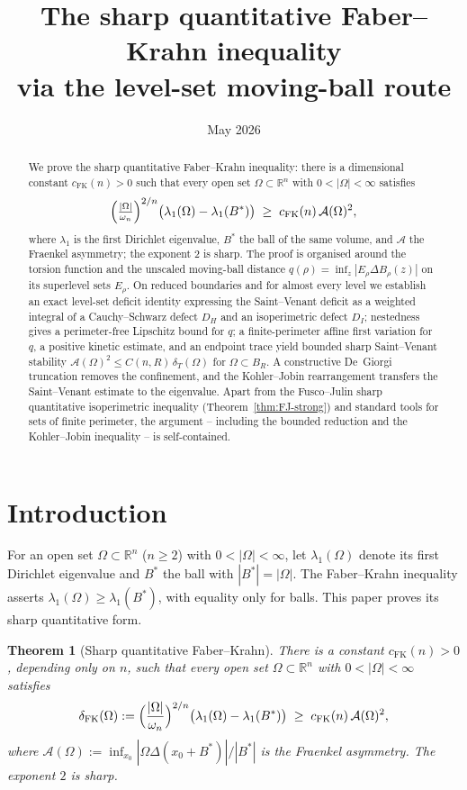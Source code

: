 \documentclass[11pt]{amsart}
\title[Sharp quantitative Faber--Krahn stability]
{The sharp quantitative Faber--Krahn inequality\\
via the level-set moving-ball route}
\author{}
\date{May 2026}
\newtheorem{theorem}{Theorem}[section]
\theoremstyle{definition}
\newcommand{\R}{\mathbb R}
\newcommand{\Om}{\Omega}
\newcommand{\Fr}{\mathcal A}
\newcommand{\dT}{\delta_T}
\newcommand{\Bstar}{B^*}
\newcommand{\deltaFK}{\delta_{\mathrm{FK}}}
\begin{document}
\begin{abstract}
We prove the sharp quantitative Faber--Krahn inequality: there is a dimensional
constant \(c_{\mathrm{FK}}(n)>0\) such that every open set \(\Om\subset\R^n\)
with \(0<|\Om|<\infty\) satisfies
\[
   \Bigl(\tfrac{|\Om|}{\omega_n}\Bigr)^{2/n}
   \bigl(\lambda_1(\Om)-\lambda_1(\Bstar)\bigr)
   \;\ge\; c_{\mathrm{FK}}(n)\,\Fr(\Om)^2 ,
\]
where \(\lambda_1\) is the first Dirichlet eigenvalue, \(\Bstar\) the ball of
the same volume, and \(\Fr\) the Fraenkel asymmetry; the exponent \(2\) is
sharp.  The proof is organised around the torsion function and the unscaled
moving-ball distance \(q(\rho)=\inf_{z}|E_\rho\Delta B_\rho(z)|\) on its
superlevel sets \(E_\rho\).  On reduced boundaries and for almost every level we
establish an exact level-set deficit identity expressing the Saint--Venant
deficit as a weighted integral of a Cauchy--Schwarz defect \(D_H\) and an
isoperimetric defect \(D_I\); nestedness gives a perimeter-free Lipschitz bound
for \(q\); a finite-perimeter affine first variation for \(q\), a positive
kinetic estimate, and an endpoint trace yield bounded sharp Saint--Venant
stability \(\Fr(\Om)^2\le C(n,R)\,\dT(\Om)\) for \(\Om\subset B_R\).  A
constructive De~Giorgi truncation removes the confinement, and the
Kohler--Jobin rearrangement transfers the Saint--Venant estimate to the
eigenvalue.  Apart from the Fusco--Julin sharp quantitative isoperimetric
inequality (Theorem~\ref{thm:FJ-strong}) and standard tools for sets of finite
perimeter, the argument -- including the bounded reduction and the Kohler--Jobin
inequality -- is self-contained.
\end{abstract}

\maketitle
\tableofcontents

\section{Introduction}\label{sec:intro}

For an open set \(\Om\subset\R^n\) (\(n\ge2\)) with \(0<|\Om|<\infty\), let
\(\lambda_1(\Om)\) denote its first Dirichlet eigenvalue and \(\Bstar\) the ball
with \(|\Bstar|=|\Om|\).  The Faber--Krahn inequality asserts
\(\lambda_1(\Om)\ge\lambda_1(\Bstar)\), with equality only for balls.  This
paper proves its sharp quantitative form.

\begin{theorem}[Sharp quantitative Faber--Krahn]\label{thm:FK-main}
There is a constant \(c_{\mathrm{FK}}(n)>0\), depending only on \(n\), such that
every open set \(\Om\subset\R^n\) with \(0<|\Om|<\infty\) satisfies
\[
   \deltaFK(\Om):=
   \Bigl(\frac{|\Om|}{\omega_n}\Bigr)^{2/n}
   \bigl(\lambda_1(\Om)-\lambda_1(\Bstar)\bigr)
   \;\ge\; c_{\mathrm{FK}}(n)\,\Fr(\Om)^2,
\]
where \(\Fr(\Om):=\inf_{x_0}|\Om\Delta(x_0+\Bstar)|/|\Bstar|\) is the Fraenkel
asymmetry.  The exponent \(2\) is sharp.
\end{theorem}
\end{document}
